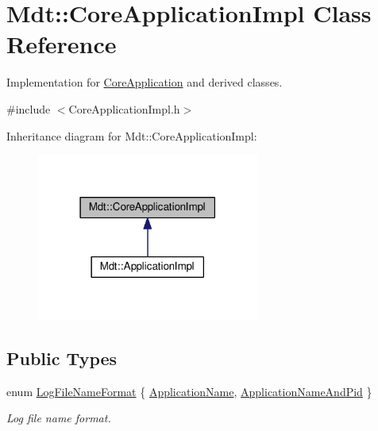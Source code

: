 \hypertarget{class_mdt_1_1_core_application_impl}{}\section{Mdt\+:\+:Core\+Application\+Impl Class Reference}
\label{class_mdt_1_1_core_application_impl}


Implementation for \hyperlink{class_mdt_1_1_core_application}{Core\+Application} and derived classes.  




{\ttfamily \#include $<$Core\+Application\+Impl.\+h$>$}



Inheritance diagram for Mdt\+:\+:Core\+Application\+Impl\+:\nopagebreak
\begin{figure}[H]
\begin{center}
\leavevmode
\includegraphics[width=207pt]{class_mdt_1_1_core_application_impl__inherit__graph}
\end{center}
\end{figure}
\subsection*{Public Types}
\begin{DoxyCompactItemize}
\item 
enum \hyperlink{class_mdt_1_1_core_application_impl_aa5fed8435e22870a870005ee28ff6221}{Log\+File\+Name\+Format} \{ \hyperlink{class_mdt_1_1_core_application_impl_aa5fed8435e22870a870005ee28ff6221ab47da4311e174cd5978c765033f0060e}{Application\+Name}, 
\hyperlink{class_mdt_1_1_core_application_impl_aa5fed8435e22870a870005ee28ff6221ae817e774fbf9d95b9b720ce7da8e6604}{Application\+Name\+And\+Pid}
 \}\begin{DoxyCompactList}\small\item\em Log file name format. \end{DoxyCompactList}
\end{DoxyCompactItemize}
